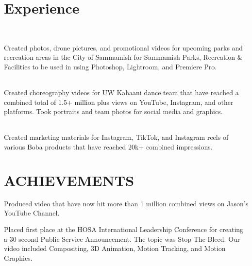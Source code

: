 \documentclass[]{main}
\begin{document}
\begin{minipage}[t]{0.66\textwidth} 


\section{Experience}

\\
\sectionsep

Created photos, drone pictures, and promotional videos for upcoming parks and recreation areas in the City of Sammamish for Sammamish Parks, Recreation \& Facilities to be used in using Photoshop, Lightroom, and Premiere Pro.

\sectionsep

\\
\vspace{\topsep} 
Created choreography videos for UW Kahaani dance team that have reached a combined total of 1.5+ million plus views on YouTube, Instagram, and other platforms.
Took portraits and team photos for social media and graphics.
\sectionsep

 \\
\vspace{\topsep}
Created marketing materials for Instagram, TikTok, and Instagram reels of various Boba products that have reached 20k+ combined impressions.

\sectionsep


\section{ACHIEVEMENTS}
Produced video that have now hit more than 1 million combined views on Jason's YouTube Channel.
\sectionsep


Placed first place at the HOSA International Leadership Conference for creating a 30 second Public Service Announcement. The topic was Stop The Bleed. Our video included Compositing, 3D Animation, Motion Tracking, and Motion Graphics.
\sectionsep


\end{minipage}
\end{document}
